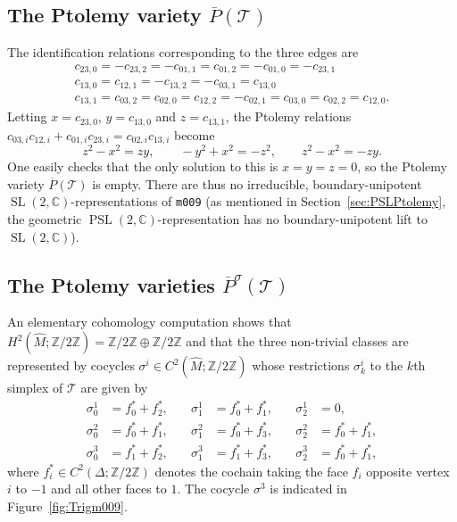 \documentclass[11pt]{amsart}
\theoremstyle{plain}
\theoremstyle{definition}
\numberwithin{equation}{section}
\newcommand{\Z}{\mathbb Z}
\newcommand{\C}{\mathbb C}
\newcommand{\T}{\mathcal T}
\DeclareMathOperator{\PSL}{PSL}
\DeclareMathOperator{\SL}{SL}
\begin{document}
\subsection{The Ptolemy variety $\overline P(\T)$}\label{sec:SLexample}
The identification relations corresponding to the three edges are
\begin{equation}
\begin{gathered}
c_{23,0}=-c_{23,2}=-c_{01,1}=c_{01,2}=-c_{01,0}=-c_{23,1}\\
c_{13,0}=c_{12,1}=-c_{13,2}=-c_{03,1}=c_{13,0}\\
c_{13,1}=c_{03,2}=c_{02,0}=c_{12,2}=-c_{02,1}=c_{03,0}=c_{02,2}=c_{12,0}.
\end{gathered}
\end{equation}
Letting $x=c_{23,0}$, $y=c_{13,0}$ and $z=c_{13,1}$, the Ptolemy relations $c_{03,i}c_{12,i}+c_{01,i}c_{23,i}=c_{02,i}c_{13,i}$ become
\begin{equation}\label{eq:m009PtolemySL}
z^2-x^2=zy,\qquad -y^2+x^2=-z^2,\qquad z^2-x^2=-zy.
\end{equation}
One easily checks that the only solution to this is $x=y=z=0$, so the Ptolemy variety $\overline P(\T)$ is empty. There are thus no irreducible, boundary-unipotent $\SL(2,\C)$-representations of \texttt{m009} (as mentioned in Section~\ref{sec:PSLPtolemy}, the geometric $\PSL(2,\C)$-representation has no boundary-unipotent lift to $\SL(2,\C)$).

\subsection{The Ptolemy varieties $\overline P^\sigma(\T)$}\label{sec:PSLexample}

An elementary cohomology computation shows that $H^2(\widehat M;\Z/2\Z)=\Z/2\Z\oplus\Z/2\Z$ and that the three non-trivial classes are represented by cocycles $\sigma^i\in C^2(\widehat M;\Z/2\Z)$ whose restrictions $\sigma^i_k$ to the $k$th simplex of $\T$ are given by
\begin{equation}
\begin{aligned}
\sigma^1_0&=f_{0}^*+f_{2}^*,\quad&\sigma^1_1&=f_{0}^*+f_{1}^*,\quad&\sigma^1_2&=0,\\
\sigma^2_0&=f_{0}^*+f_{1}^*,\quad&\sigma^2_1&=f_{0}^*+f_{3}^*,\quad&\sigma^2_2&=f_{0}^*+f_{1}^*,\\
\sigma^3_0&=f_{1}^*+f_{2}^*,\quad&\sigma^3_1&=f_{1}^*+f_{3}^*,\quad&\sigma^3_2&=f_{0}^*+f_{1}^*,
\end{aligned}
\end{equation}
where $f_{i}^*\in C^2(\Delta;\Z/2\Z)$ denotes the cochain taking the face $f_{i}$ opposite vertex $i$ to $-1$ and all other faces to $1$. The cocycle $\sigma^3$ is indicated in Figure~\ref{fig:Trigm009}. 
\end{document}
